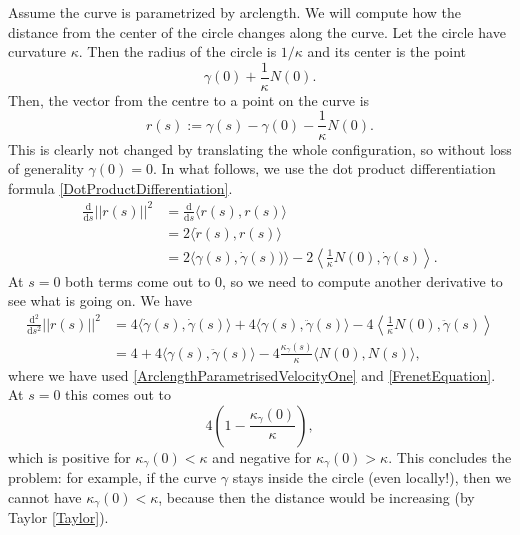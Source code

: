 Assume the curve is parametrized by arclength. We will compute how the distance from the center of the circle changes along the curve. Let the circle have curvature \(\kappa\). Then the radius of the circle is \(1/\kappa\) and its center is the point
\[
\gamma(0) + \frac1\kappa N(0).
\]
Then, the vector from the centre to a point on the curve is
\[
r(s) := \gamma(s) - \gamma(0) - \frac1\kappa N(0).
\]
This is clearly not changed by translating the whole configuration, so without loss of generality \(\gamma(0) = 0\). In what follows, we use the dot product differentiation formula \ref{DotProductDifferentiation}.
\begin{align*}
    \frac{\mathrm{d}}{\mathrm{d}s} \lvert \lvert r(s) \rvert \rvert^2 &= \frac{\mathrm{d}}{\mathrm{d}s} \langle r(s), r(s) \rangle \\
                                                                      &=  2\langle \dot{r}(s), r(s) \rangle \\
                                                                      &= 2\langle \gamma(s), \dot{\gamma}(s))\rangle - 2\left\langle \frac1\kappa N(0), \dot{\gamma}(s)\right\rangle.
\end{align*}
At \( s = 0 \) both terms come out to \( 0 \), so we need to compute another derivative to see what is going on. We have
\begin{align*}
    \frac{\mathrm{d^2}}{\mathrm{d}s^2} \lvert \lvert r(s) \rvert \rvert^2 &= 4\langle \dot{\gamma}(s), \dot{\gamma}(s)\rangle + 4\langle \gamma(s), \ddot\gamma(s) \rangle - 4\left\langle \frac1\kappa N(0), \ddot\gamma (s) \right\rangle \\
                                                                      &=  4 + 4\langle \gamma(s), \ddot\gamma(s) \rangle - 4\frac{\kappa_\gamma(s)}{\kappa}\langle N(0), N(s) \rangle,
\end{align*}
where we have used \ref{ArclengthParametrisedVelocityOne} and \ref{FrenetEquation}. At \( s = 0 \) this comes out to
\[
    4 \left(1 - \frac{\kappa_\gamma(0)}{\kappa}\right),
\]
which is positive for \(\kappa_\gamma(0) < \kappa\) and negative for \( \kappa_\gamma(0) > \kappa \). This concludes the problem: for example, if the curve \(\gamma\) stays inside the circle (even locally!), then we cannot have \(\kappa_\gamma(0) < \kappa \), because then the distance would be increasing (by Taylor \ref{Taylor}).

